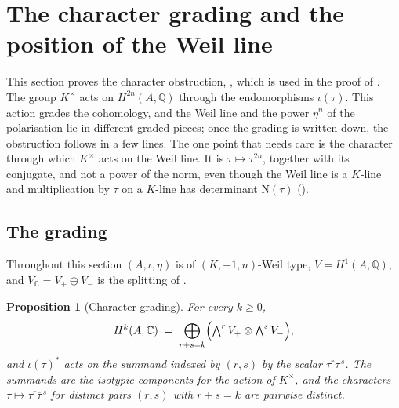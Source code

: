 \documentclass[11pt,reqno]{amsart}
\theoremstyle{plain}
\newtheorem{proposition}[theorem]{Proposition}
\theoremstyle{definition}
\theoremstyle{remark}
\newcommand{\QQ}{\mathbb{Q}}
\newcommand{\CC}{\mathbb{C}}
\newcommand{\Nm}{\mathrm{N}}             %
\newcommand{\Kx}{K^{\times}}
\newcommand{\bbar}[1]{\overline{#1}}
\begin{document}
\section{The character grading and the position of the Weil line}
\label{sec:characters}

This section proves the character obstruction, , which
is used in the proof of . The group $\Kx$
acts on $H^{2n}(A,\QQ)$ through the endomorphisms $\iota(\tau)$. This action
grades the cohomology, and the Weil line and the power $\eta^{n}$ of the
polarisation lie in different graded pieces; once the grading is written
down, the obstruction follows in a few lines. The one point that needs care
is the character through which $\Kx$ acts on the Weil line. It is
$\tau\mapsto\tau^{2n}$, together with its conjugate, and not a power of the
norm, even though the Weil line is a $K$-line and multiplication by $\tau$ on
a $K$-line has determinant $\Nm(\tau)$ ().

\subsection{The grading}

Throughout this section $(A,\iota,\eta)$ is of $(K,-1,n)$-Weil type,
$V=H^{1}(A,\QQ)$, and $V_{\CC}=V_{+}\oplus V_{-}$ is the splitting of
.

\begin{proposition}[Character grading]\label{prop:grading}
For every $k\ge0$,
\begin{equation}\label{eq:grading}
  H^{k}(A,\CC)\;=\;\bigoplus_{r+s=k}
    \Bigl(\textstyle\bigwedge^{r}V_{+}\otimes\bigwedge^{s}V_{-}\Bigr),
\end{equation}
and $\iota(\tau)^{*}$ acts on the summand indexed by $(r,s)$ by the scalar
$\tau^{r}\bbar{\tau}^{\,s}$. The summands are the isotypic components for the
action of $\Kx$, and the characters $\tau\mapsto\tau^{r}\bbar{\tau}^{\,s}$ for
distinct pairs $(r,s)$ with $r+s=k$ are pairwise distinct.
\end{proposition}
\end{document}
